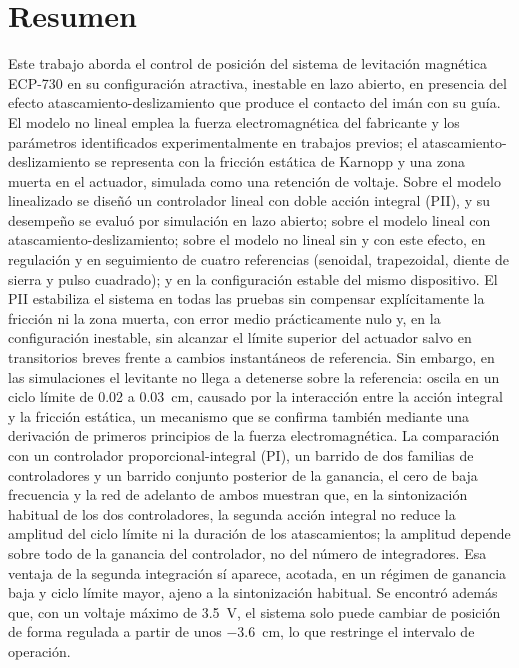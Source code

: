 \chapter*{Resumen}\label{Chap:Resumen}

Este trabajo aborda el control de posición del sistema de levitación magnética ECP-730 en su configuración atractiva, inestable en lazo abierto, en presencia del efecto atascamiento-deslizamiento que produce el contacto del imán con su guía. El modelo no lineal emplea la fuerza electromagnética del fabricante y los parámetros identificados experimentalmente en trabajos previos; el atascamiento-deslizamiento se representa con la fricción estática de Karnopp y una zona muerta en el actuador, simulada como una retención de voltaje. Sobre el modelo linealizado se diseñó un controlador lineal con doble acción integral (PII), y su desempeño se evaluó por simulación en lazo abierto; sobre el modelo lineal con atascamiento-deslizamiento; sobre el modelo no lineal sin y con este efecto, en regulación y en seguimiento de cuatro referencias (senoidal, trapezoidal, diente de sierra y pulso cuadrado); y en la configuración estable del mismo dispositivo. El PII estabiliza el sistema en todas las pruebas sin compensar explícitamente la fricción ni la zona muerta, con error medio prácticamente nulo y, en la configuración inestable, sin alcanzar el límite superior del actuador salvo en transitorios breves frente a cambios instantáneos de referencia. Sin embargo, en las simulaciones el levitante no llega a detenerse sobre la referencia: oscila en un ciclo límite de 0.02 a 0.03~cm, causado por la interacción entre la acción integral y la fricción estática, un mecanismo que se confirma también mediante una derivación de primeros principios de la fuerza electromagnética. La comparación con un controlador proporcional-integral (PI), un barrido de dos familias de controladores y un barrido conjunto posterior de la ganancia, el cero de baja frecuencia y la red de adelanto de ambos muestran que, en la sintonización habitual de los dos controladores, la segunda acción integral no reduce la amplitud del ciclo límite ni la duración de los atascamientos; la amplitud depende sobre todo de la ganancia del controlador, no del número de integradores. Esa ventaja de la segunda integración sí aparece, acotada, en un régimen de ganancia baja y ciclo límite mayor, ajeno a la sintonización habitual. Se encontró además que, con un voltaje máximo de 3.5~V, el sistema solo puede cambiar de posición de forma regulada a partir de unos $-3.6$~cm, lo que restringe el intervalo de operación.
